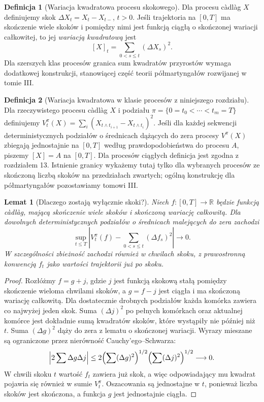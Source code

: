 \documentclass[11pt,a4paper,oneside]{report}
\numberwithin{equation}{chapter}
\theoremstyle{plain}
\newtheorem{lemat}[twierdzenie]{Lemat}
\theoremstyle{definition}
\newtheorem{definicja}{Definicja}[chapter]
\theoremstyle{remark}
\newcommand{\R}{\mathbb{R}}
\begin{document}
\begin{definicja}[Wariacja kwadratowa procesu skokowego]
Dla procesu c\`adl\`ag $X$ definiujemy skok
$\Delta X_t=X_t-X_{t-}$, $t>0$. Jeśli trajektoria
na $[0,T]$ ma skończenie wiele skoków i pomiędzy nimi
jest funkcją ciągłą o skończonej wariacji całkowitej,
to jej \emph{wariacją kwadratową} jest
\[
[X]_t=\sum_{0<s\le t}(\Delta X_s)^2.
\]
Dla szerszych klas procesów granica sum kwadratów
przyrostów wymaga dodatkowej konstrukcji, stanowiącej
część teorii półmartyngałów rozwijanej w tomie III.
\end{definicja}


\begin{definicja}[Wariacja kwadratowa w klasie procesów z niniejszego rozdziału]
Dla rzeczywistego procesu c\`adl\`ag $X$ i podziału
$\pi=\{0=t_0<\cdots<t_m=T\}$ definiujemy
$V_t^\pi(X)=\sum_i(X_{t\wedge t_{i+1}}-X_{t\wedge t_i})^2$.
Jeśli dla każdej sekwencji deterministycznych podziałów o
średnicach dążących do zera procesy $V^\pi(X)$ zbiegają
jednostajnie na $[0,T]$ według prawdopodobieństwa do
procesu $A$, piszemy $[X]=A$ na $[0,T]$.
Dla procesów ciągłych definicja jest zgodna z rozdziałem 13.
Istnienie granicy wykażemy tutaj tylko dla wybranych procesów
ze skończoną liczbą skoków na przedziałach zwartych;
ogólną konstrukcję dla półmartyngałów pozostawiamy tomowi III.
\end{definicja}

\begin{lemat}[Dlaczego zostają wyłącznie skoki?]
Niech $f:[0,T]\to\R$ będzie funkcją c\`adl\`ag,
mającą skończenie wiele skoków i skończoną wariację
całkowitą. Dla dowolnych deterministycznych podziałów
o średnicach malejących do zera zachodzi
\[
\sup_{t\le T}\left|V_t^\pi(f)-
\sum_{0<s\le t}(\Delta f_s)^2\right|\longrightarrow0.
\]
W szczególności zbieżność zachodzi również w chwilach
skoku, z prawostronną konwencją $f_t$ jako wartości
trajektorii już po skoku.
\end{lemat}
\begin{proof}
Rozłóżmy $f=g+j$, gdzie $j$ jest funkcją skokową
stałą pomiędzy skończenie wieloma chwilami skoków,
a $g=f-j$ jest ciągła i ma skończoną wariację
całkowitą. Dla dostatecznie drobnych podziałów
każda komórka zawiera co najwyżej jeden skok.
Suma $(\Delta j)^2$ po pełnych komórkach oraz
aktualnej komórce jest dokładnie sumą kwadratów
skoków, które wystąpiły nie później niż $t$. Suma $(\Delta g)^2$ dąży do zera
z lematu o skończonej wariacji. Wyrazy mieszane są
ograniczone przez nierówność Cauchy'ego--Schwarza:
\[
\left|2\sum\Delta g\Delta j\right|
\le2\Bigl(\sum(\Delta g)^2\Bigr)^{1/2}
\Bigl(\sum(\Delta j)^2\Bigr)^{1/2}\longrightarrow0.
\]
W chwili skoku $t$ wartość $f_t$ zawiera już skok,
a więc odpowiadający mu kwadrat pojawia się również
w sumie $V_t^\pi$. Oszacowania są jednostajne w $t$,
ponieważ liczba skoków jest skończona, a funkcja $g$
jest jednostajnie ciągła.
\end{proof}
\end{document}
